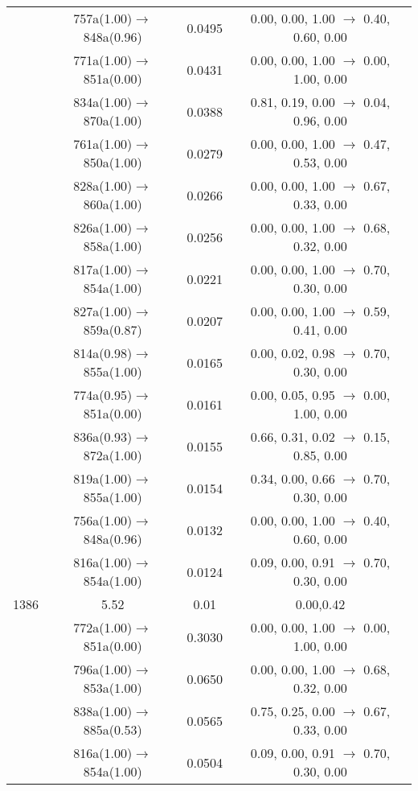 \documentclass[10pt,a4paper]{article}
\begin{document}
\begin{longtable}{c|c|c|c}
 	& 757a(1.00)$\rightarrow$848a(0.96) &	 0.0495 &	 0.00, 0.00, 1.00 $\rightarrow$ 0.40, 0.60, 0.00 \\ 
 	& 771a(1.00)$\rightarrow$851a(0.00) &	 0.0431 &	 0.00, 0.00, 1.00 $\rightarrow$ 0.00, 1.00, 0.00 \\ 
 	& 834a(1.00)$\rightarrow$870a(1.00) &	 0.0388 &	 0.81, 0.19, 0.00 $\rightarrow$ 0.04, 0.96, 0.00 \\ 
 	& 761a(1.00)$\rightarrow$850a(1.00) &	 0.0279 &	 0.00, 0.00, 1.00 $\rightarrow$ 0.47, 0.53, 0.00 \\ 
 	& 828a(1.00)$\rightarrow$860a(1.00) &	 0.0266 &	 0.00, 0.00, 1.00 $\rightarrow$ 0.67, 0.33, 0.00 \\ 
 	& 826a(1.00)$\rightarrow$858a(1.00) &	 0.0256 &	 0.00, 0.00, 1.00 $\rightarrow$ 0.68, 0.32, 0.00 \\ 
 	& 817a(1.00)$\rightarrow$854a(1.00) &	 0.0221 &	 0.00, 0.00, 1.00 $\rightarrow$ 0.70, 0.30, 0.00 \\ 
 	& 827a(1.00)$\rightarrow$859a(0.87) &	 0.0207 &	 0.00, 0.00, 1.00 $\rightarrow$ 0.59, 0.41, 0.00 \\ 
 	& 814a(0.98)$\rightarrow$855a(1.00) &	 0.0165 &	 0.00, 0.02, 0.98 $\rightarrow$ 0.70, 0.30, 0.00 \\ 
 	& 774a(0.95)$\rightarrow$851a(0.00) &	 0.0161 &	 0.00, 0.05, 0.95 $\rightarrow$ 0.00, 1.00, 0.00 \\ 
 	& 836a(0.93)$\rightarrow$872a(1.00) &	 0.0155 &	 0.66, 0.31, 0.02 $\rightarrow$ 0.15, 0.85, 0.00 \\ 
 	& 819a(1.00)$\rightarrow$855a(1.00) &	 0.0154 &	 0.34, 0.00, 0.66 $\rightarrow$ 0.70, 0.30, 0.00 \\ 
 	& 756a(1.00)$\rightarrow$848a(0.96) &	 0.0132 &	 0.00, 0.00, 1.00 $\rightarrow$ 0.40, 0.60, 0.00 \\ 
 	& 816a(1.00)$\rightarrow$854a(1.00) &	 0.0124 &	 0.09, 0.00, 0.91 $\rightarrow$ 0.70, 0.30, 0.00 \\ 
 \hline1386 &	 5.52 &	 0.01 &	 0.00,0.42 \\ 
  	& 772a(1.00)$\rightarrow$851a(0.00) &	 0.3030 &	 0.00, 0.00, 1.00 $\rightarrow$ 0.00, 1.00, 0.00 \\ 
 	& 796a(1.00)$\rightarrow$853a(1.00) &	 0.0650 &	 0.00, 0.00, 1.00 $\rightarrow$ 0.68, 0.32, 0.00 \\ 
 	& 838a(1.00)$\rightarrow$885a(0.53) &	 0.0565 &	 0.75, 0.25, 0.00 $\rightarrow$ 0.67, 0.33, 0.00 \\ 
 	& 816a(1.00)$\rightarrow$854a(1.00) &	 0.0504 &	 0.09, 0.00, 0.91 $\rightarrow$ 0.70, 0.30, 0.00 \\ 

\end{longtable}
\end{document}
